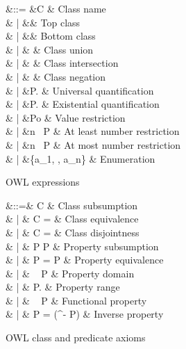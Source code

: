\documentclass{llncs}
\begin{document}
\vspace{-16pt}
\begin{figure}[htb]
\scriptsize
\hspace{-28pt}
\begin{minipage}[t]{0.6\textwidth}
\begin{syntax}
 &::= &C                              & Class name\\
            & |  &\top                           & Top class\\
            & |  &\bot                           & Bottom class\\
            & |  & \sqcup {} & Class union\\
            & |  & \sqcap {} & Class intersection\\
            & |  &\lnot {}              & Class negation\\
            & |  &\forall P.          & Universal quantification\\
            & |  &\exists P.          & Existential quantification\\
            & |  &P\colon o                      & Value restriction\\
            & |  &\geq n~ P                      & At least number restriction\\
            & |  &\leq n~ P                      & At most number restriction\\
            & |  &\{a_1, \cdots, a_n\}           & Enumeration
\end{syntax}
\vspace{-16pt}
\caption{OWL expressions}\label{fig:owl-des}
\end{minipage}
%
\hspace{-12pt}
\begin{minipage}[t]{0.45\textwidth}
\begin{syntax}
 &::=& C \sqsubseteq {}                & Class subsumption\\
             & | & C =                           & Class equivalence\\
             & | & C \sqcap {} = \bot              & Class disjointness\\
             & | & P \sqsubseteq P                          & Property subsumption\\
             & | & P = P                                    & Property equivalence\\
             & | & ~ P\sqsubseteq {}         & Property domain\\
             & | & \top \sqsubseteq \forall P.   & Property range\\
             & | & \top \sqsubseteq {}~ P               & Functional property\\
             & | & P = ({}^- P)                             & Inverse property
\end{syntax}
\vspace{+20pt} \centering\caption{OWL class and predicate
axioms}\label{fig:owl-axm}
\end{minipage}
\end{figure}
\end{document}
